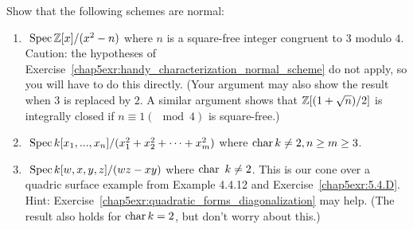 \begin{exr}\label{chap5exr:normal_schemes_examples}
Show that the following schemes are normal:
\begin{enumerate}[label=(\alph*)]
\item  $\text{ Spec\,}\mathbb Z[x]/(x^2-n)$ where $n$ is a square-free integer congruent to $3$ modulo $4$. Caution: the hypotheses of Exercise~\ref{chap5exr:handy_characterization_normal_scheme} do not apply, so you will have to do this directly. (Your argument may also show the result when $3$ is replaced by $2$. A similar argument shows that $\mathbb Z[(1+\sqrt{n})/2]$ is integrally closed if $n \equiv 1 (\mod 4)$ is square-free.)
\item
 $\text{ Spec\,} k[x_1,...,x_n]/(x^2_1+x_2^2+\cdots+x^2_m)$ where $\text{char\,} k\neq 2, n\geq m\geq 3$.
\item $\text{ Spec\,} k[w, x, y, z]/(wz - xy)$ where $\text{char\,}\ k\neq  2$. This is our cone over a quadric surface example from Example 4.4.12 and Exercise~\ref{chap5exr:5.4.D}. Hint: Exercise~\ref{chap5exr:quadratic_forms_diagonalization} may help. (The result also holds for $\text{char\,} k = 2$, but don’t worry about this.)
\end{enumerate}
\end{exr}
